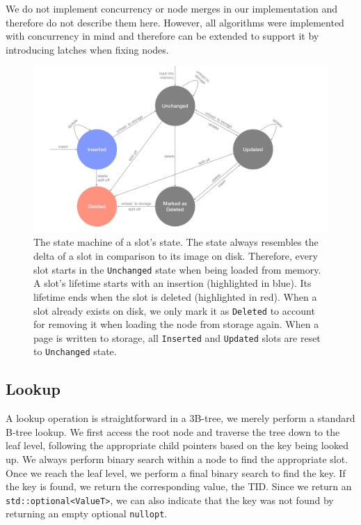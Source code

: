 We do not implement concurrency or node merges in our implementation and therefore do not describe them here.
However, all algorithms were implemented with concurrency in mind and therefore can be extended to support it by introducing latches when fixing nodes.

\begin{figure}[htbp]
  \centering
  \includegraphics[width=1\textwidth]{figures/slot_states.pdf}
  \caption{
    The state machine of a slot's state. 
    The state always resembles the delta of a slot in comparison to its image on disk. 
    Therefore, every slot starts in the \texttt{Unchanged} state when being loaded from memory. 
    A slot's lifetime starts with an insertion (highlighted in blue). 
    Its lifetime ends when the slot is deleted (highlighted in red).
    When a slot already exists on disk, we only mark it as \texttt{Deleted} to account for removing it when loading the node from storage again.
    When a page is written to storage, all \texttt{Inserted} and \texttt{Updated} slots are reset to \texttt{Unchanged} state. 
  }
  \label{fig:slot-states}
\end{figure}

\subsection*{Lookup}
A lookup operation is straightforward in a 3B-tree, we merely perform a standard B-tree lookup.
We first access the root node and traverse the tree down to the leaf level, following the appropriate child pointers based on the key being looked up.
We always perform binary search within a node to find the appropriate slot. 
Once we reach the leaf level, we perform a final binary search to find the key.
If the key is found, we return the corresponding value, the \ac{TID}.
Since we return an \texttt{std::optional<ValueT>}, we can also indicate that the key was not found by returning an empty optional \texttt{nullopt}.

